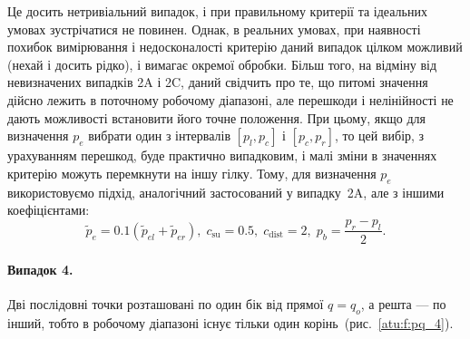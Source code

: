 Це досить нетривіальний випадок, і при правильному критерії
та ідеальних умовах зустрічатися не повинен. Однак, в реальних
умовах, при наявності похибок вимірювання і недосконалості критерію
даний випадок цілком можливий (нехай і досить рідко), і вимагає
окремої обробки. Більш того, на відміну від невизначених
випадків 2A і 2C, даний свідчить про те, що питомі значення дійсно
лежить в поточному робочому діапазоні, але перешкоди і
нелінійності не дають можливості встановити його точне
положення. При цьому, якщо для визначення
$p_e$ вибрати один з інтервалів
$[p_l, p_c]$ і
$[p_c, p_r]$, то цей вибір, з урахуванням перешкод, буде практично
випадковим, і малі зміни в значеннях критерію можуть перемкнути
на іншу гілку. Тому, для визначення
$p_e$ використовуємо підхід, аналогічний застосований у випадку~2A,
але з іншими коефіцієнтами:
%
\begin{equation}
  \tilde{p}_e = 0.1 ( \tilde{p}_{el} + \tilde{p}_{er} ),
  \;
  c_\mathrm{su} = 0.5, \;  c_\mathrm{dist} = 2, \;   p_b = \frac{p_r - p_l}{2}.
  \label{atu:eq:pr_e_3}
\end{equation}


\paragraph{Випадок 4.}
%
Дві послідовні точки
розташовані по один бік
від прямої
$q = q_o$, а решта --- по інший, тобто в робочому діапазоні існує тільки один
корінь~(рис.~\ref{atu:f:pq_4}).


